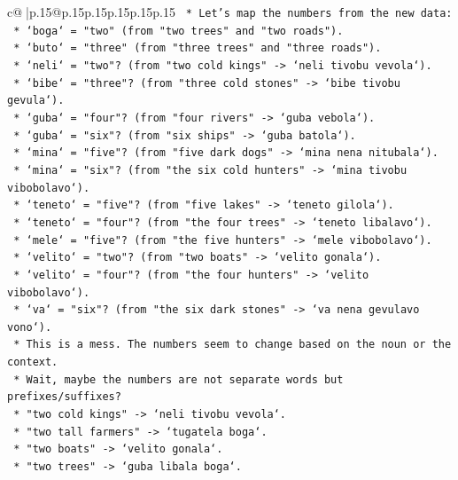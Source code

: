\documentclass{article}
\begin{document}
{\begin{supertabular}{c@{$\;$}|p{.15\linewidth}@{}p{.15\linewidth}p{.15\linewidth}p{.15\linewidth}p{.15\linewidth}p{.15\linewidth}}
{{{\texttt{        *   Let's map the numbers from the new data:} \\
\texttt{            *   `boga` = "two" (from "two trees" and "two roads").} \\
\texttt{            *   `buto` = "three" (from "three trees" and "three roads").} \\
\texttt{            *   `neli` = "two"? (from "two cold kings" {-}> `neli tivobu vevola`).} \\
\texttt{            *   `bibe` = "three"? (from "three cold stones" {-}> `bibe tivobu gevula`).} \\
\texttt{            *   `guba` = "four"? (from "four rivers" {-}> `guba vebola`).} \\
\texttt{            *   `guba` = "six"? (from "six ships" {-}> `guba batola`).} \\
\texttt{            *   `mina` = "five"? (from "five dark dogs" {-}> `mina nena nitubala`).} \\
\texttt{            *   `mina` = "six"? (from "the six cold hunters" {-}> `mina tivobu vibobolavo`).} \\
\texttt{            *   `teneto` = "five"? (from "five lakes" {-}> `teneto gilola`).} \\
\texttt{            *   `teneto` = "four"? (from "the four trees" {-}> `teneto libalavo`).} \\
\texttt{            *   `mele` = "five"? (from "the five hunters" {-}> `mele vibobolavo`).} \\
\texttt{            *   `velito` = "two"? (from "two boats" {-}> `velito gonala`).} \\
\texttt{            *   `velito` = "four"? (from "the four hunters" {-}> `velito vibobolavo`).} \\
\texttt{            *   `va` = "six"? (from "the six dark stones" {-}> `va nena gevulavo vono`).} \\
\texttt{        *   This is a mess. The numbers seem to change based on the noun or the context.} \\
\texttt{        *   Wait, maybe the numbers are not separate words but prefixes/suffixes?} \\
\texttt{        *   "two cold kings" {-}> `neli tivobu vevola`.} \\
\texttt{        *   "two tall farmers" {-}> `tugatela boga`.} \\
\texttt{        *   "two boats" {-}> `velito gonala`.} \\
\texttt{        *   "two trees" {-}> `guba libala boga`.} \\
}}}
\end{supertabular}}
\end{document}
